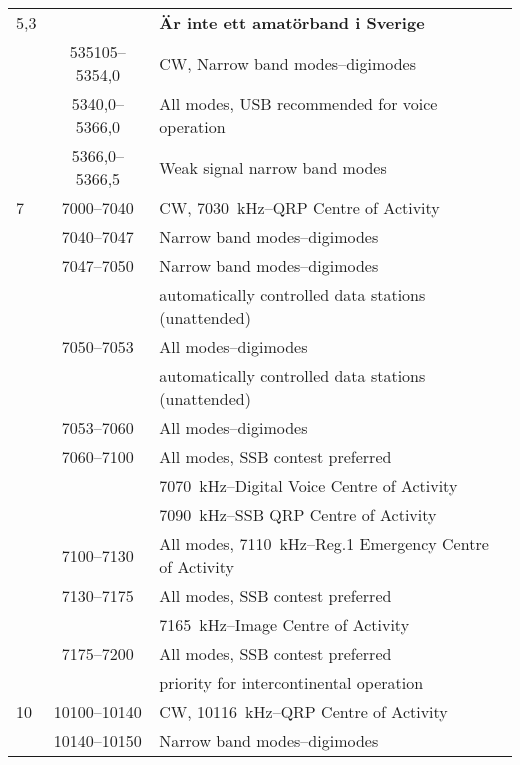 \begin{longtable}{lcl}
5,3  & & \textbf{Är inte ett amatörband i Sverige}\\
 & 535105--5354,0 & CW, Narrow band modes--digimodes\\
 & 5340,0--5366,0 & All modes, USB recommended for voice operation\\
 & 5366,0--5366,5 & Weak signal narrow band modes\\

7    & 7000--7040 & CW, 7030~kHz--QRP Centre of Activity\\
     & 7040--7047 & Narrow band modes--digimodes\\
     & 7047--7050 & Narrow band modes--digimodes\\
     & & automatically controlled data stations (unattended)\\
     & 7050--7053 & All modes--digimodes\\
     & & automatically controlled data stations (unattended)\\
     & 7053--7060 & All modes--digimodes\\
     & 7060--7100 & All modes, SSB contest preferred\\
     & & 7070~kHz--Digital Voice Centre of Activity\\
     & & 7090~kHz--SSB QRP Centre of Activity\\
     & 7100--7130 & All modes, 7110~kHz--Reg.1 Emergency Centre of Activity\\
     & 7130--7175 & All modes, SSB contest preferred\\
     & & 7165~kHz--Image Centre of Activity\\
     & 7175--7200 & All modes, SSB contest preferred\\
     & & priority for intercontinental operation\\

10   & 10100--10140 & CW, 10116~kHz--QRP Centre of Activity\\
     & 10140--10150 & Narrow band modes--digimodes\\


\end{longtable}

